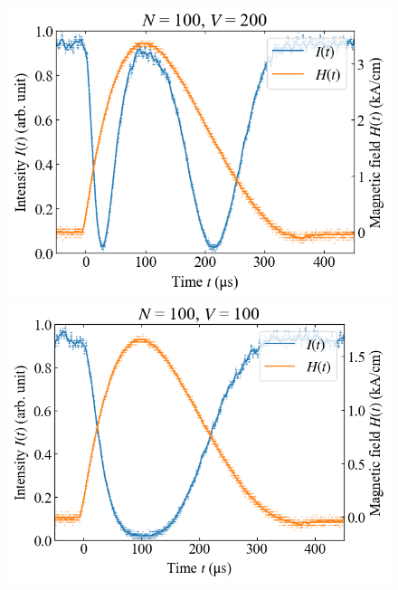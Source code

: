 \documentclass[9pt,dvipdfmx,a4paper]{jsarticle}
\begin{document}
\begin{figure}[H]
\begin{minipage}[t]{0.24\columnwidth}
        \includegraphics[width = \columnwidth]{xt/07.png}
    \end{minipage}
    \hfill
    \begin{minipage}[t]{0.24\columnwidth}
        \centering
        \includegraphics[width = \columnwidth]{xt/08.png}
    \end{minipage}
\end{figure}
\end{document}
